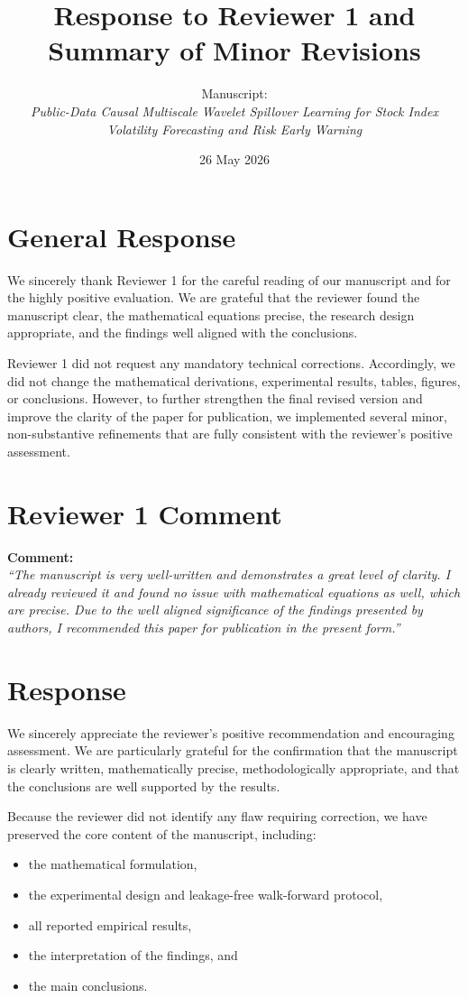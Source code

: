 \documentclass[11pt,a4paper]{article}
\title{Response to Reviewer 1 and Summary of Minor Revisions}
\author{\parbox{0.92\textwidth}{\centering Manuscript:\\[2pt]\textit{Public-Data Causal Multiscale Wavelet Spillover Learning for Stock Index Volatility Forecasting and Risk Early Warning}}}
\date{26 May 2026}
\begin{document}
\maketitle

\section*{General Response}

We sincerely thank Reviewer 1 for the careful reading of our manuscript and for the highly positive evaluation. We are grateful that the reviewer found the manuscript clear, the mathematical equations precise, the research design appropriate, and the findings well aligned with the conclusions.

Reviewer 1 did not request any mandatory technical corrections. Accordingly, we did not change the mathematical derivations, experimental results, tables, figures, or conclusions. However, to further strengthen the final revised version and improve the clarity of the paper for publication, we implemented several minor, non-substantive refinements that are fully consistent with the reviewer's positive assessment.

\section*{Reviewer 1 Comment}

\textbf{Comment:} \\
\emph{``The manuscript is very well-written and demonstrates a great level of clarity. I already reviewed it and found no issue with mathematical equations as well, which are precise. Due to the well aligned significance of the findings presented by authors, I recommended this paper for publication in the present form.''}

\section*{Response}

We sincerely appreciate the reviewer's positive recommendation and encouraging assessment. We are particularly grateful for the confirmation that the manuscript is clearly written, mathematically precise, methodologically appropriate, and that the conclusions are well supported by the results.

Because the reviewer did not identify any flaw requiring correction, we have preserved the core content of the manuscript, including:
\begin{itemize}[leftmargin=1.5em]
\item the mathematical formulation,
\item the experimental design and leakage-free walk-forward protocol,
\item all reported empirical results,
\item the interpretation of the findings, and
\item the main conclusions.
\end{itemize}
\end{document}
